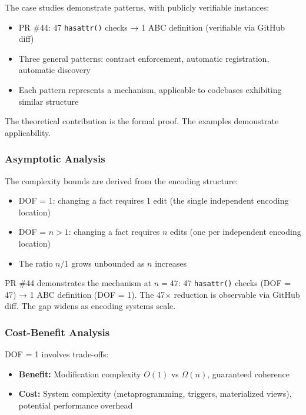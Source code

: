 The case studies demonstrate patterns, with publicly verifiable instances:

\begin{itemize}
\tightlist
\item PR \#44: 47 \texttt{hasattr()} checks → 1 ABC definition (verifiable via GitHub diff)
\item Three general patterns: contract enforcement, automatic registration, automatic discovery
\item Each pattern represents a mechanism, applicable to codebases exhibiting similar structure
\end{itemize}

The theoretical contribution is the formal proof. The examples demonstrate applicability.

\subsubsection{Asymptotic Analysis}

The complexity bounds are derived from the encoding structure:

\begin{itemize}
\tightlist
\item DOF = 1: changing a fact requires 1 edit (the single independent encoding location)
\item DOF = $n > 1$: changing a fact requires $n$ edits (one per independent encoding location)
\item The ratio $n/1$ grows unbounded as $n$ increases
\end{itemize}

PR \#44 demonstrates the mechanism at $n = 47$: 47 \texttt{hasattr()} checks (DOF = 47) → 1 ABC definition (DOF = 1). The 47$\times$ reduction is observable via GitHub diff. The gap widens as encoding systems scale.

\subsubsection{Cost-Benefit Analysis}

DOF = 1 involves trade-offs:
\begin{itemize}
\tightlist
\item \textbf{Benefit:} Modification complexity $O(1)$ vs $\Omega(n)$, guaranteed coherence
\item \textbf{Cost:} System complexity (metaprogramming, triggers, materialized views), potential performance overhead
\end{itemize}

